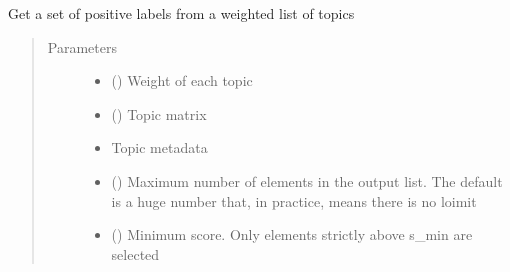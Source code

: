 \documentclass[letterpaper,10pt,english]{sphinxmanual}
\begin{document}
\begin{fulllineitems}
\begin{fulllineitems}
\begin{quote}
\begin{description}
\begin{itemize}
\end{itemize}

\end{description}\end{quote}

\end{fulllineitems}


\begin{fulllineitems}
\label{\detokenize{dc_task_manager:src.task_manager.TaskManager.get_labels_by_topics}}
\sphinxAtStartPar
Get a set of positive labels from a weighted list of topics
\begin{quote}\begin{description}
\item[{Parameters}] \leavevmode\begin{itemize}
\item {} 
\sphinxAtStartPar
{} () \textendash{} Weight of each topic

\item {} 
\sphinxAtStartPar
{} () \textendash{} Topic matrix

\item {} 
\sphinxAtStartPar
{} \textendash{} Topic metadata

\item {} 
\sphinxAtStartPar
{} () \textendash{} Maximum number of elements in the output list. The default is
a huge number that, in practice, means there is no loimit

\item {} 
\sphinxAtStartPar
{} () \textendash{} Minimum score. Only elements strictly above s\_min are selected


\end{itemize}
\end{description}
\end{quote}
\end{fulllineitems}
\end{fulllineitems}
\end{document}
